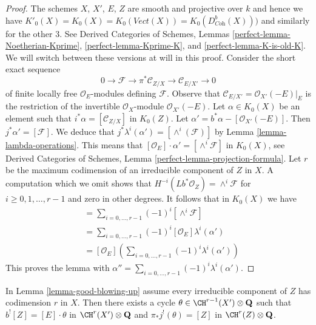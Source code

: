 \begin{proof}
The schemes $X$, $X'$, $E$, $Z$ are smooth and projective over
$k$ and hence we have $K'_0(X) = K_0(X) = K_0(\textit{Vect}(X)) =
K_0(D^b_{\textit{Coh}}(X)))$
and similarly for the other $3$. See
Derived Categories of Schemes, Lemmas \ref{perfect-lemma-Noetherian-Kprime},
\ref{perfect-lemma-Kprime-K}, and \ref{perfect-lemma-K-is-old-K}.
We will switch between these versions at will in this proof.
Consider the short exact sequence
$$
0 \to \mathcal{F} \to \pi^*\mathcal{C}_{Z/X} \to \mathcal{C}_{E/X'} \to 0
$$
of finite locally free $\mathcal{O}_E$-modules defining $\mathcal{F}$.
Observe that $\mathcal{C}_{E/X'} = \mathcal{O}_{X'}(-E)|_E$
is the restriction of the invertible $\mathcal{O}_X$-module
$\mathcal{O}_{X'}(-E)$.
Let $\alpha \in K_0(X)$ be an element such that
$i^*\alpha = [\mathcal{C}_{Z/X}]$ in $K_0(Z)$.
Let $\alpha' = b^*\alpha - [\mathcal{O}_{X'}(-E)]$.
Then $j^*\alpha' = [\mathcal{F}]$. We deduce that
$j^*\lambda^i(\alpha') = [\wedge^i(\mathcal{F})]$ by
Lemma \ref{lemma-lambda-operations}.
This means that $[\mathcal{O}_E] \cdot \alpha' = [\wedge^i\mathcal{F}]$
in $K_0(X)$, see
Derived Categories of Schemes, Lemma \ref{perfect-lemma-projection-formula}.
Let $r$ be the maximum codimension of an irreducible component of $Z$
in $X$. A computation which we omit shows that
$H^{-i}(Lb^*\mathcal{O}_Z) = \wedge^i\mathcal{F}$
for $i \geq 0, 1, \ldots, r - 1$ and zero in other degrees.
It follows that in $K_0(X)$ we have
\begin{align*}
[Lb^*\mathcal{O}_Z] & =
\sum\nolimits_{i = 0, \ldots, r - 1} (-1)^i[\wedge^i\mathcal{F}] \\
& =
\sum\nolimits_{i = 0, \ldots, r - 1} (-1)^i[\mathcal{O}_E] \lambda^i(\alpha') \\
& =
[\mathcal{O}_E] \left(\sum\nolimits_{i = 0, \ldots, r - 1}
(-1)^i \lambda^i(\alpha')\right)
\end{align*}
This proves the lemma with
$\alpha'' = \sum_{i = 0, \ldots, r - 1} (-1)^i \lambda^i(\alpha')$.
\end{proof}

\begin{lemma}
\label{lemma-divide-pullback-good-blowing-up}
In Lemma \ref{lemma-good-blowing-up} assume every irreducible component
of $Z$ has codimension $r$ in $X$.
Then there exists a cycle $\theta \in \CH^{r - 1}(X') \otimes \mathbf{Q}$
such that $b^![Z] = [E] \cdot \theta$ in $\CH^r(X') \otimes \mathbf{Q}$ and
$\pi_*j^!(\theta) = [Z]$ in $\CH^r(Z) \otimes \mathbf{Q}$.
\end{lemma}

